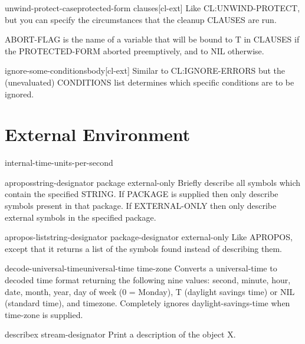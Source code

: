 \documentclass[10pt,english]{book}
\begin{document}
\begin{macro}{unwind-protect-case}{\op protected-form \body clauses}[cl-ext]
  Like CL:UNWIND-PROTECT, but you can specify the circumstances that
the cleanup CLAUSES are run.

ABORT-FLAG is the name of a variable that will be bound to T in
CLAUSES if the PROTECTED-FORM aborted preemptively, and to NIL
otherwise.
\end{macro}

\begin{macro}{ignore-some-conditions}{\rest \body body}[cl-ext]
  Similar to CL:IGNORE-ERRORS but the (unevaluated) CONDITIONS
list determines which specific conditions are to be ignored.
\end{macro}



\chapter{External Environment}

\begin{constant}{internal-time-units-per-second}{}
  
\end{constant}

\begin{function}{apropos}{string-designator \op package external-only}
  Briefly describe all symbols which contain the specified STRING.
  If PACKAGE is supplied then only describe symbols present in
  that package. If EXTERNAL-ONLY then only describe
  external symbols in the specified package.
\end{function}

\begin{function}{apropos-list}{string-designator \op package-designator external-only}
  Like APROPOS, except that it returns a list of the symbols found instead
  of describing them.
\end{function}

\begin{function}{decode-universal-time}{universal-time \op time-zone}
  Converts a universal-time to decoded time format returning the following
   nine values: second, minute, hour, date, month, year, day of week (0 =
   Monday), T (daylight savings time) or NIL (standard time), and timezone.
   Completely ignores daylight-savings-time when time-zone is supplied.
\end{function}

\begin{function}{describe}{x \op stream-designator}
  Print a description of the object X.
\end{function}
\end{document}
